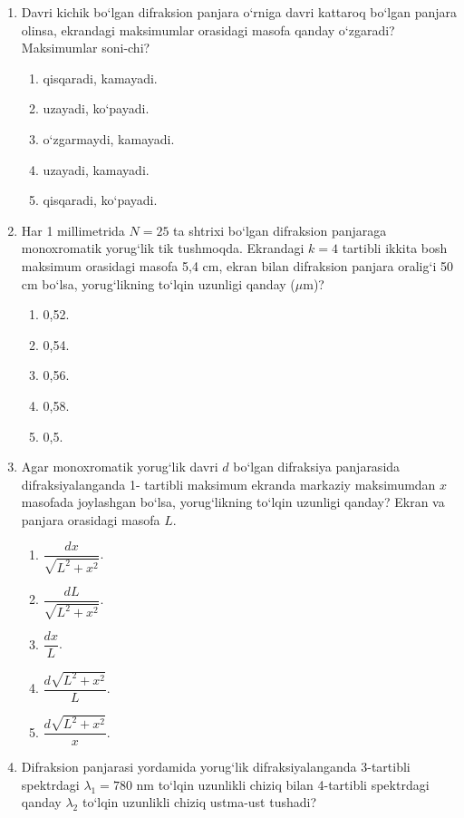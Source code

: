 \begin{enumerate}
\item Davri kichik bo‘lgan difraksion panjara o‘rniga davri kattaroq bo‘lgan panjara olinsa, ekrandagi maksimumlar orasidagi masofa qanday o‘zgaradi? Maksimumlar soni-chi?
\begin{enumerate}[label=\Alph*)]
\item qisqaradi, kamayadi.
\item uzayadi, ko‘payadi.
\item o‘zgarmaydi, kamayadi.
\item uzayadi, kamayadi.
\item qisqaradi, ko‘payadi.
\end{enumerate}

\item Har 1 millimetrida $N=25$ ta shtrixi bo‘lgan difraksion panjaraga monoxromatik yorug‘lik tik tushmoqda. Ekrandagi $k=4$ tartibli ikkita bosh maksimum orasidagi masofa 5,4 cm, ekran bilan difraksion panjara oralig‘i 50 cm bo‘lsa, yorug‘likning to‘lqin uzunligi qanday ($\mu$m)?
\begin{enumerate}[label=\Alph*)]
\item 0,52.
\item 0,54.
\item 0,56.
\item 0,58.
\item 0,5.
\end{enumerate}

\item Agar monoxromatik yorug‘lik davri $d$ bo‘lgan difraksiya panjarasida difraksiyalanganda 1- tartibli maksimum ekranda markaziy maksimumdan $x$ masofada joylashgan bo‘lsa, yorug‘likning to‘lqin uzunligi qanday? Ekran va panjara orasidagi masofa $L$.


\begin{enumerate}[label=\Alph*)]
\item $\dfrac{dx}{\sqrt{L^2+x^2}}$.
\item $\dfrac{dL}{\sqrt{L^2+x^2}}$.
\item $\dfrac{dx}{L}$.
\item $\dfrac{d\sqrt{L^2+x^2}}{L}$.
\item $\dfrac{d\sqrt{L^2+x^2}}{x}$.
\end{enumerate}

\item Difraksion panjarasi yordamida yorug‘lik difraksiyalanganda 3-tartibli spektrdagi $\lambda_1=780$ nm to‘lqin uzunlikli chiziq bilan 4-tartibli spektrdagi qanday $\lambda_2$ to‘lqin uzunlikli chiziq ustma-ust tushadi?


\end{enumerate}
